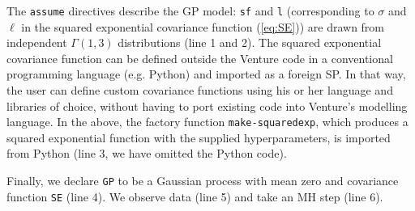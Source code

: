 The \texttt{assume} directives describe the GP model: \texttt{sf} and \texttt{l} (corresponding to $\sigma$ and $\ell$ in the squared exponential covariance function (\ref{eq:SE})) are drawn from independent $\Gamma(1,3)$ distributions (line 1 and 2).
The squared exponential covariance function can be defined outside the Venture code in a conventional programming language (e.g. Python) and imported as a foreign SP.
In that way, the user can define custom covariance functions using his or her language and libraries of choice, without having to port existing code into Venture's modelling language.
In the above, the factory function \texttt{make-squaredexp}, which produces a squared exponential function with the supplied hyperparameters, is imported from Python (line 3, we have omitted the Python code).

Finally, we declare \texttt{GP} to be a Gaussian process with mean zero and covariance function \texttt{SE} (line 4). We observe data (line 5) and take an \ac{MH} step (line 6).






